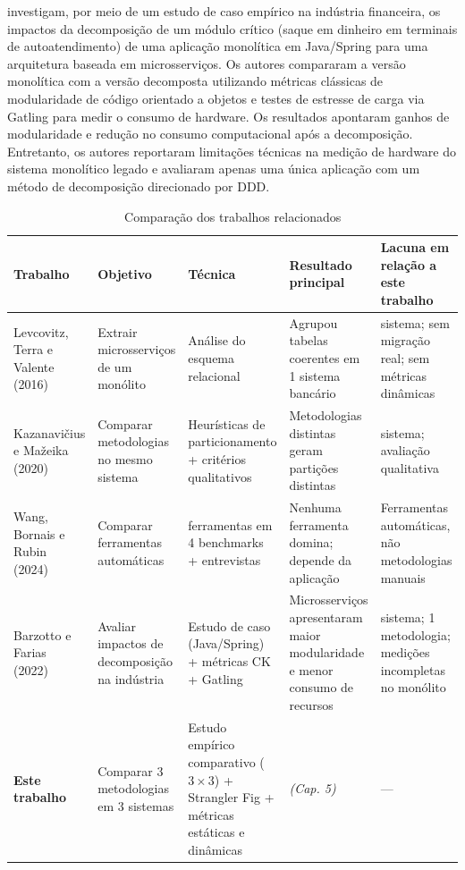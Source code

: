 \textcite{barzotto2022} investigam, por meio de um estudo de caso empírico na indústria financeira, os impactos da decomposição de um módulo crítico (saque em dinheiro em terminais de autoatendimento) de uma aplicação monolítica em Java/Spring para uma arquitetura baseada em microsserviços. Os autores compararam a versão monolítica com a versão decomposta utilizando métricas clássicas de modularidade de código orientado a objetos e testes de estresse de carga via Gatling para medir o consumo de hardware. Os resultados apontaram ganhos de modularidade e redução no consumo computacional após a decomposição. Entretanto, os autores reportaram limitações técnicas na medição de hardware do sistema monolítico legado e avaliaram apenas uma única aplicação com um método de decomposição direcionado por DDD.


\begin{table}[htbp]
\caption{Comparação dos trabalhos relacionados}
\label{tab:trabalhos_relacionados}
\centering
\small
\renewcommand{\arraystretch}{1.15}
\begin{tabularx}{\textwidth}{@{}>{\raggedright\arraybackslash}p{2.4cm} >{\raggedright\arraybackslash}X >{\raggedright\arraybackslash}X >{\raggedright\arraybackslash}X >{\raggedright\arraybackslash}X@{}}
\hline
\textbf{Trabalho} & \textbf{Objetivo} & \textbf{Técnica} & \textbf{Resultado principal} & \textbf{Lacuna em relação a este trabalho} \\
\hline
 
Levcovitz, Terra e Valente (2016) &
Extrair microsserviços de um monólito &
Análise do esquema relacional &
Agrupou tabelas coerentes em 1 sistema bancário &
1 sistema; sem migração real; sem métricas dinâmicas \\
\hline
 
Kazanavičius e Mažeika (2020) &
Comparar metodologias no mesmo sistema &
Heurísticas de particionamento + critérios qualitativos &
Metodologias distintas geram partições distintas &
1 sistema; avaliação qualitativa \\
\hline
 
Wang, Bornais e Rubin (2024) &
Comparar ferramentas automáticas &
8 ferramentas em 4 benchmarks + entrevistas &
Nenhuma ferramenta domina; depende da aplicação &
Ferramentas automáticas, não metodologias manuais \\
\hline

Barzotto e Farias (2022) &
Avaliar impactos de decomposição na indústria &
Estudo de caso (Java/Spring) + métricas CK + Gatling &
Microsserviços apresentaram maior modularidade e menor consumo de recursos &
1 sistema; 1 metodologia; medições incompletas no monólito \\
\hline
 
\textbf{Este trabalho} &
Comparar 3 metodologias em 3 sistemas &
Estudo empírico comparativo ($3 \times 3$) + Strangler Fig + métricas estáticas e dinâmicas &
\textit{(Cap. 5)} &
--- \\
\hline
\end{tabularx}
\end{table}


